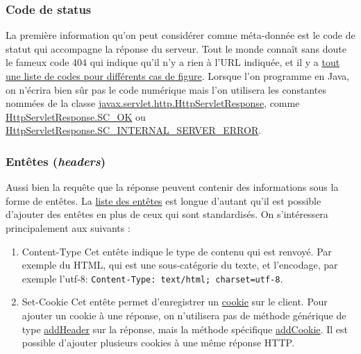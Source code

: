 \documentclass[11pt]{article}
\begin{document}
\subsubsection{Code de status}
\label{sec:org0848e2e}
La première information qu'on peut considérer comme méta-donnée est le code de
statut qui accompagne la réponse du serveur. Tout le monde connaît sans doute le
fameux code 404 qui indique qu'il n'y a rien à l'URL indiquée, et il y a \href{https://fr.wikipedia.org/wiki/Liste_des_codes_HTTP}{tout
une liste de codes pour différents cas de figure}. Lorsque l'on programme en
Java, on n'écrira bien sûr pas le code numérique mais l'on utilisera les
constantes nommées de la classe \href{https://tomcat.apache.org/tomcat-5.5-doc/servletapi/javax/servlet/http/HttpServletResponse.html}{javax.servlet.http.HttpServletResponse}, comme
\href{https://tomcat.apache.org/tomcat-5.5-doc/servletapi/javax/servlet/http/HttpServletResponse.html#SC_OK}{HttpServletResponse.SC\_OK} ou \href{https://tomcat.apache.org/tomcat-5.5-doc/servletapi/javax/servlet/http/HttpServletResponse.html#SC_INTERNAL_SERVER_ERROR}{HttpServletResponse.SC\_INTERNAL\_SERVER\_ERROR}.

\subsubsection{Entêtes (\emph{headers})}
\label{sec:orgb445f01}

Aussi bien la requête que la réponse peuvent contenir des informations sous la
forme de entêtes. La \href{https://en.wikipedia.org/wiki/List_of_HTTP_header_fields}{liste des entêtes} est longue d'autant qu'il est possible
d'ajouter des entêtes en plus de ceux qui sont standardisés. On s'intéressera
principalement aux suivants :

\begin{enumerate}
\item Content-Type
\label{sec:org5ab5cde}
Cet entête indique le type de contenu qui est renvoyé. Par exemple du HTML, qui
est une sous-catégorie du texte, et l'encodage, par exemple l'utf-8:
\texttt{Content-Type: text/html; charset=utf-8}.

\item Set-Cookie
\label{sec:org1b46d3b}
Cet entête permet d'enregistrer un \href{https://fr.wikipedia.org/wiki/Cookie_(informatique)}{cookie} sur le client. Pour ajouter un cookie
à une réponse, on n'utilisera pas de méthode générique de type \href{https://tomcat.apache.org/tomcat-5.5-doc/servletapi/javax/servlet/http/HttpServletResponse.html#addHeader(java.lang.String,\%2520java.lang.String)}{addHeader} sur la
réponse, mais la méthode spécifique \href{https://tomcat.apache.org/tomcat-5.5-doc/servletapi/javax/servlet/http/HttpServletResponse.html#addCookie(javax.servlet.http.Cookie)}{addCookie}. Il est possible d'ajouter
plusieurs cookies à une même réponse HTTP.
\end{enumerate}
\end{document}
